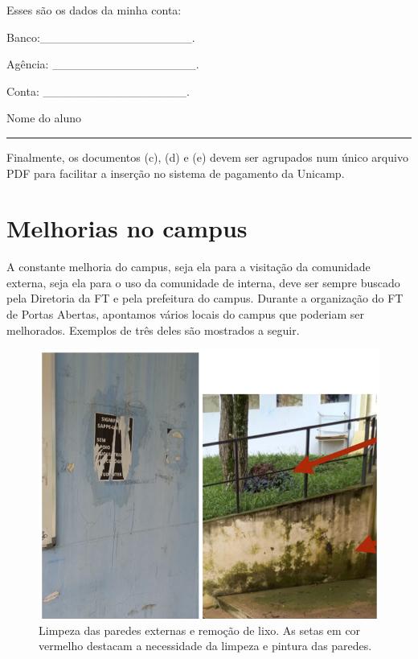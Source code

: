 \documentclass[
  letterpaper,
  DIV=11,
  numbers=noendperiod]{scrreprt}
\begin{document}
Esses são os dados da minha conta:

Banco:\_\_\_\_\_\_\_\_\_\_\_\_\_\_\_\_\_\_.

Agência: \_\_\_\_\_\_\_\_\_\_\_\_\_\_\_\_\_.

Conta: \_\_\_\_\_\_\_\_\_\_\_\_\_\_\_\_\_.

Nome do aluno

\begin{center}\rule{0.5\linewidth}{0.5pt}\end{center}

Finalmente, os documentos (c), (d) e (e) devem ser agrupados num único
arquivo PDF para facilitar a inserção no sistema de pagamento da
Unicamp.

\section{Melhorias no campus}\label{melhorias-no-campus}

A constante melhoria do campus, seja ela para a visitação da comunidade
externa, seja ela para o uso da comunidade de interna, deve ser sempre
buscado pela Diretoria da FT e pela prefeitura do campus. Durante a
organização do FT de Portas Abertas, apontamos vários locais do campus
que poderiam ser melhorados. Exemplos de três deles são mostrados a
seguir.

\begin{figure}[H]

{\centering \includegraphics[width=0.6\linewidth,height=\textheight,keepaspectratio]{recomendacoes/melhoria-1.png}

}

\caption{Limpeza das paredes externas e remoção de lixo. As setas em cor
vermelho destacam a necessidade da limpeza e pintura das paredes.}

\end{figure}%
\end{document}
